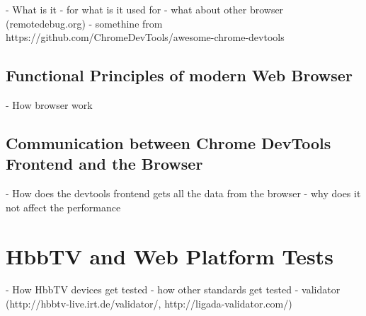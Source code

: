 - What is it
- for what is it used for
- what about other browser (remotedebug.org)
- somethine from https://github.com/ChromeDevTools/awesome-chrome-devtools

\subsection{Functional Principles of modern Web Browser\label{sec:howbrowserwork}}

- How browser work

\subsection{Communication between Chrome DevTools Frontend and the Browser}

- How does the devtools frontend gets all the data from the browser
- why does it not affect the performance

\section{HbbTV and Web Platform Tests}

- How HbbTV devices get tested
- how other standards get tested
- validator (http://hbbtv-live.irt.de/validator/, http://ligada-validator.com/)
